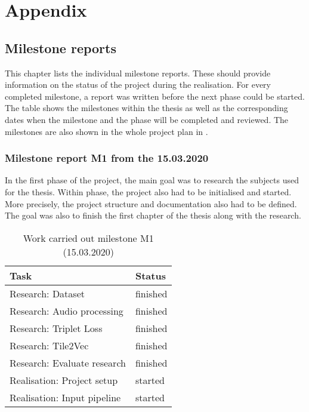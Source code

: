 \chapter{Appendix}
\label{app:Appendix}

\section{Milestone reports}
\label{app:Milestone-Reports}
This chapter lists the individual milestone reports. These should provide information on the status of the project during the realisation. For every completed milestone, a report was written before the next phase could be started. The table  shows the milestones within the thesis as well as the corresponding dates when the milestone and the phase will be completed and reviewed. The milestones are also shown in the whole project plan in .

\subsection{Milestone report M1 from the 15.03.2020}
In the first phase of the project, the main goal was to research the subjects used for the thesis. Within phase, the project also had to be initialised and started. More precisely, the project structure and documentation also had to be defined. The goal was also to finish the first chapter of the thesis  along with the research.

\begin{table}[htbp]
    \centering
    \caption{Work carried out milestone M1 (15.03.2020)}
	\label{tab:Work-Carried-Out-M1}
    \begin{tabular}{p{} | p{}}
        \toprule
        \textbf{Task} & \textbf{Status} \\ 
        \midrule[1pt]
        Research: Dataset & finished \\
        \hline
        Research: Audio processing & finished \\
        \hline
        Research: Triplet Loss & finished \\
        \hline
        Research: Tile2Vec & finished \\
        \hline
        Research: Evaluate research & finished \\
        \hline
        Realisation: Project setup & started \\
        \hline
        Realisation: Input pipeline & started \\
        \bottomrule
    \end{tabular}
\end{table}

